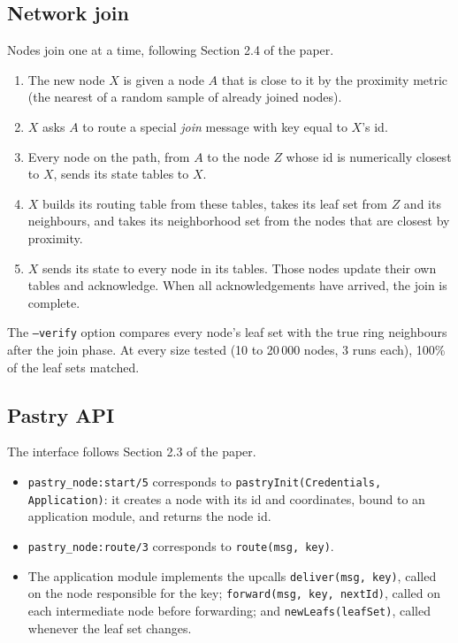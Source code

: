\documentclass[10pt]{article}
\begin{document}
\subsection{Network join}
Nodes join one at a time, following Section 2.4 of the paper.
\begin{enumerate}
  \item The new node $X$ is given a node $A$ that is close to it by the proximity metric (the nearest of a random sample of already joined nodes).
  \item $X$ asks $A$ to route a special \emph{join} message with key equal to $X$'s id.
  \item Every node on the path, from $A$ to the node $Z$ whose id is numerically closest to $X$, sends its state tables to $X$.
  \item $X$ builds its routing table from these tables, takes its leaf set from $Z$ and its neighbours, and takes its neighborhood set from the nodes that are closest by proximity.
  \item $X$ sends its state to every node in its tables. Those nodes update their own tables and acknowledge. When all acknowledgements have arrived, the join is complete.
\end{enumerate}
The \texttt{--verify} option compares every node's leaf set with the true ring neighbours after the join phase.
At every size tested (10 to 20\,000 nodes, 3 runs each), 100\% of the leaf sets matched.

\subsection{Pastry API}
The interface follows Section 2.3 of the paper.
\begin{itemize}
  \item \texttt{pastry\_node:start/5} corresponds to \texttt{pastryInit(Credentials, Application)}: it creates a node with its id and coordinates, bound to an application module, and returns the node id.
  \item \texttt{pastry\_node:route/3} corresponds to \texttt{route(msg, key)}.
  \item The application module implements the upcalls \texttt{deliver(msg, key)}, called on the node responsible for the key; \texttt{forward(msg, key, nextId)}, called on each intermediate node before forwarding; and \texttt{newLeafs(leafSet)}, called whenever the leaf set changes.
\end{itemize}
\end{document}

